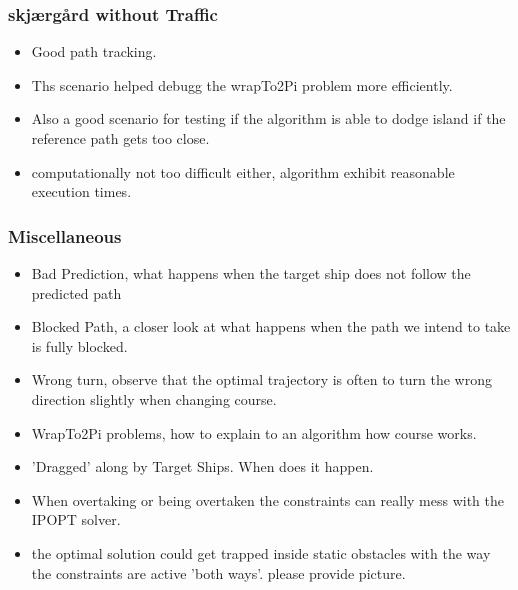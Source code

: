 \subsubsection{skjærgård without Traffic}
\begin{itemize}
    \item Good path tracking.
    \item Ths scenario helped debugg the wrapTo2Pi problem more efficiently.
    \item Also a good scenario for testing if the algorithm is able to dodge island if the reference path gets too close.
    \item computationally not too difficult either, algorithm exhibit reasonable execution times.
\end{itemize}

\subsubsection{Miscellaneous}
\begin{itemize}
    \item Bad Prediction, what happens when the target ship does not follow the predicted path
    \item Blocked Path, a closer look at what happens when the path we intend to take is fully blocked.
    \item Wrong turn, observe that the optimal trajectory is often to turn the wrong direction slightly when changing course.
    \item WrapTo2Pi problems, how to explain to an algorithm how course works.
    \item 'Dragged' along by Target Ships. When does it happen.
    \item When overtaking or being overtaken the constraints can really mess with the \gls{IPOPT} solver.
    \item the optimal solution could get trapped inside static obstacles with the way the constraints are active 'both ways'. please provide picture.
\end{itemize}


